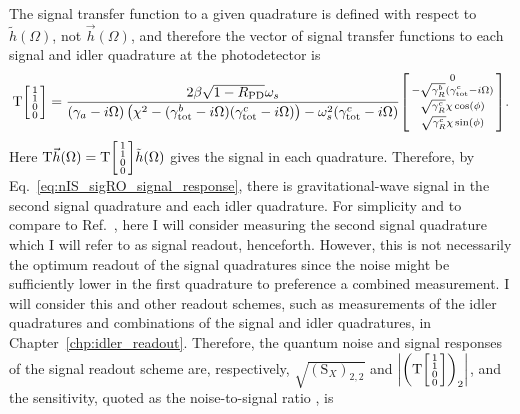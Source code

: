 The signal transfer function to a given quadrature is defined with respect to $\tilde h(\Omega)$, not $\vec h(\Omega)$, and therefore the vector of signal transfer functions to each signal and idler quadrature at the photodetector is
\begin{equation}\label{eq:nIS_sigRO_signal_response}
\text{T}\begin{bsmallmatrix}1 \\1\\0\\0\end{bsmallmatrix} = \frac{2 \beta \sqrt{1-R_\text{PD}} \omega_s}{(\gamma_a-i \Omega ) \left(\chi ^2-(\gamma^b_\text{tot}-i\Omega) (\gamma^c_\text{tot}-i\Omega)\right)-\omega_s^2 (\gamma^c_\text{tot}-i \Omega )} \begin{bsmallmatrix}0 \\-\sqrt{\gamma^b_R}(\gamma^c_\text{tot}-i\Omega)\\\sqrt{\gamma^c_R}\chi\cos(\phi)\\\sqrt{\gamma^c_R}\chi\sin(\phi)\end{bsmallmatrix}.
\end{equation}
Here $\text{T}\vec h(\Omega)=\text{T}\begin{bsmallmatrix}1 \\1\\0\\0\end{bsmallmatrix}\tilde h(\Omega)$ gives the signal in each quadrature.
Therefore, by Eq.~\ref{eq:nIS_sigRO_signal_response}, there is gravitational-wave signal in the second signal quadrature and each idler quadrature. For simplicity and to compare to Ref.~\cite{liBroadbandSensitivityImprovement2020}, here I will consider measuring the second signal quadrature which I will refer to as signal readout, henceforth. However, this is not necessarily the optimum readout of the signal quadratures since the noise might be sufficiently lower in the first quadrature to preference a combined measurement. I will consider this and other readout schemes, such as measurements of the idler quadratures and combinations of the signal and idler quadratures, in Chapter~\ref{chp:idler_readout}.
Therefore, the quantum noise and signal responses of the signal readout scheme are, respectively, $\sqrt{(\text{S}_X)_{2,2}}$ and $\abs{\left(\text{T}\begin{bsmallmatrix}1 \\1\\0\\0\end{bsmallmatrix}\right)_2}$, and the sensitivity, quoted as the noise-to-signal ratio , is
